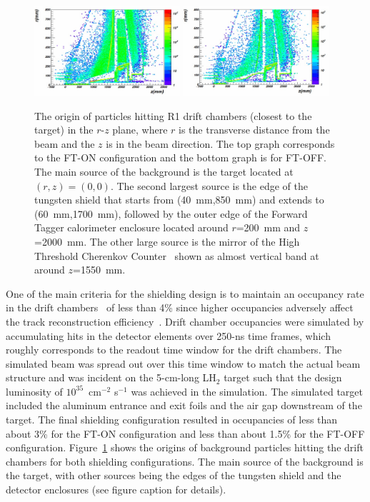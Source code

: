 \begin{figure}[t]
\begin{center}
\includegraphics[width=0.48\textwidth]{fton_final_origin.pdf}
\includegraphics[width=0.48\textwidth]{ftoff_final_origin.pdf}
\caption{The origin of particles hitting R1 drift chambers (closest to the target) in the $r$-$z$ plane, where $r$
  is the transverse distance from the beam and the $z$ is in the beam direction. The top graph corresponds to the
  FT-ON configuration and the bottom graph is for FT-OFF. The main source of the background is the target located
  at $(r,z)=(0,0)$. The second largest source is the edge of the tungsten shield that starts from (40~mm,850~mm)
  and extends to (60~mm,1700~mm), followed by the outer edge of the Forward Tagger calorimeter enclosure located
  around $r$=200~mm and $z$=2000~mm. The other large source is the mirror of the High Threshold Cherenkov
  Counter~\cite{htcc-nim} shown as almost vertical band at around $z$=1550~mm.}
\label{fig:origin}
\end{center}
\end{figure}

One of the main criteria for the shielding design is to maintain an occupancy rate in the drift chambers~\cite{dc-nim}
of less than 4\% since higher occupancies adversely affect the track reconstruction efficiency~\cite{recon-nim}.
Drift chamber occupancies were simulated by accumulating hits in the detector elements over 250-ns time frames,
which roughly corresponds to the readout time window for the drift chambers. The simulated beam was spread out
over this time window to match the actual beam structure and was incident on the 5-cm-long LH$_2$ target such
that the design luminosity of $10^{35}$~cm$^{-2}$ s$^{-1}$ was achieved in the simulation. The simulated target 
included the aluminum entrance and exit foils and the air gap downstream of the target. The final shielding
configuration resulted in occupancies of less than about 3\% for the FT-ON configuration and less than about
1.5\% for the FT-OFF configuration. Figure~\ref{fig:origin} shows the origins of background particles hitting the
drift chambers for both shielding configurations. The main source of the background is the target, with other
sources being the edges of the tungsten shield and the detector enclosures (see figure caption for details). 
